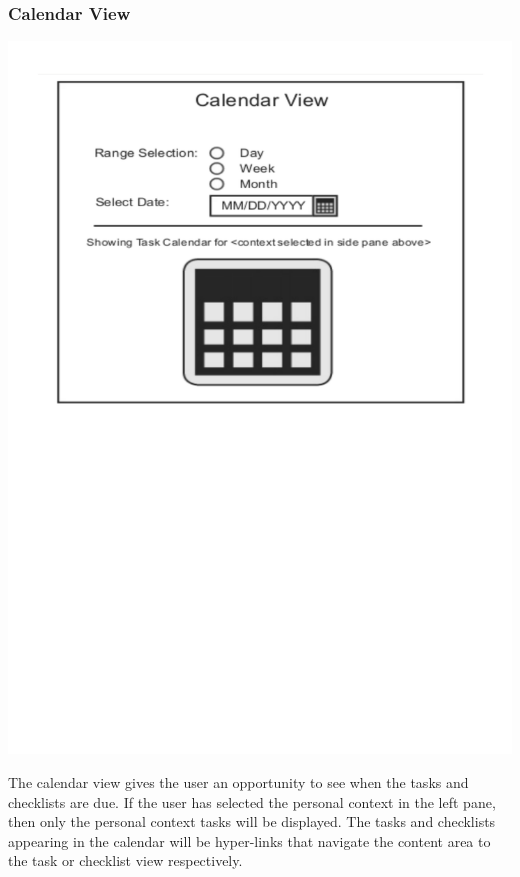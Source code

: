 \documentclass{article}
\begin{document}
\subsubsection{Calendar View}
\begin{center}
\includegraphics[trim = 0cm 14cm 0cm 0cm, clip=true, scale=0.7]{images/calendarview}
\end{center}
The calendar view gives the user an opportunity to see when the tasks and checklists are due.
If the user has selected the personal context in the left pane, then only the personal context tasks will be displayed.
The tasks and checklists appearing in the calendar will be hyper-links that navigate the content area to the task or checklist view respectively.
\end{document}
